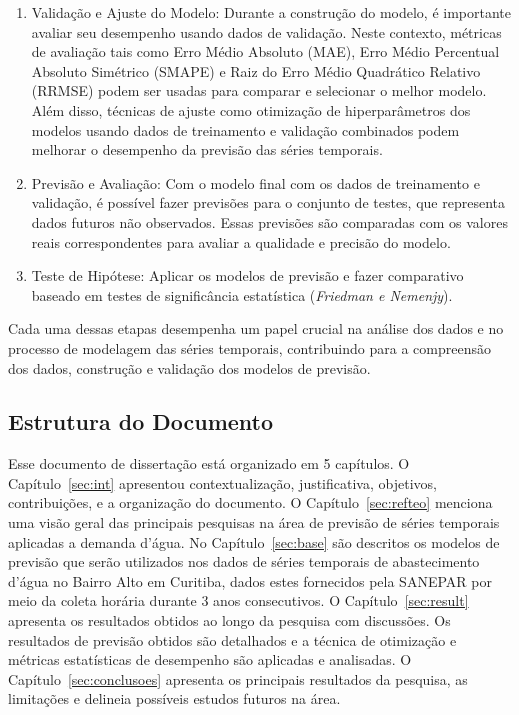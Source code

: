 \begin{enumerate}
	\item {Validação e Ajuste do Modelo}: Durante a construção do modelo, é importante avaliar seu desempenho usando dados de validação. Neste contexto, métricas de avaliação tais como Erro Médio Absoluto (MAE), Erro Médio Percentual Absoluto Simétrico (SMAPE) e Raiz do Erro Médio Quadrático Relativo (RRMSE) podem ser usadas para comparar e selecionar o melhor modelo. Além disso, técnicas de ajuste como otimização de hiperparâmetros dos modelos usando dados de treinamento e validação combinados podem melhorar o desempenho da previsão das séries temporais.
	
	\item {Previsão e Avaliação}: Com o modelo final com os dados de treinamento e validação, é possível fazer previsões para o conjunto de testes, que representa dados futuros não observados. Essas previsões são comparadas com os valores reais correspondentes para avaliar a qualidade e precisão do modelo.
	
	\item {Teste de Hipótese}: Aplicar os modelos de previsão e fazer comparativo baseado em testes de significância estatística (\textit{Friedman e Nemenjy}).
	
	
	
\end{enumerate}

Cada uma dessas etapas desempenha um papel crucial na análise dos dados e no processo de modelagem das séries temporais, contribuindo para a compreensão dos dados, construção e validação dos modelos de previsão.

\subsection{Estrutura do Documento} \label{subsec:estrutura}

Esse documento de dissertação está organizado em 5 capítulos. O Capítulo~\ref{sec:int}  apresentou contextualização, justificativa, objetivos, contribuições, e a organização do documento.  O Capítulo~\ref{sec:refteo} menciona uma visão geral das principais pesquisas na área de previsão de séries temporais aplicadas a demanda d'água. No Capítulo~\ref{sec:base} são descritos os modelos de previsão que serão utilizados nos dados de séries temporais de abastecimento d'água no Bairro Alto em Curitiba, dados estes fornecidos pela SANEPAR por meio da coleta horária durante 3 anos consecutivos. O Capítulo~\ref{sec:result} apresenta os resultados obtidos ao longo da pesquisa com discussões. Os resultados de previsão obtidos são detalhados e a técnica de otimização e métricas estatísticas de desempenho são aplicadas e analisadas. O Capítulo~\ref{sec:conclusoes} apresenta os principais resultados da pesquisa, as limitações e delineia possíveis estudos futuros na área. 

